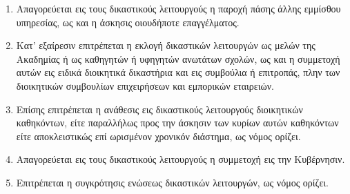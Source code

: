 \documentclass[twoside, a4paper, 10pt]{article}
\begin{document}
\begin{multicols}{2}
\begin{enumerate}
\begin{BigQuote}
\begin{enumerate}
  \item[1.] Απαγορεύεται εις τους δικαστικούς λειτουργούς η παροχή πάσης άλλης εμμίσθου υπηρεσίας, ως και η άσκησις οιουδήποτε  επαγγέλματος.
  \item[2.] Κατ' εξαίρεσιν επιτρέπεται η εκλογή δικαστικών λειτουργών ως μελών της Ακαδημίας ή ως καθηγητών ή υφηγητών ανωτάτων σχολών, ως και η συμμετοχή αυτών εις ειδικά διοικητικά δικαστήρια και εις συμβούλια ή επιτροπάς, πλην των διοικητικών συμβουλίων επιχειρήσεων και εμπορικών εταιρειών.
  \item[3.] Επίσης επιτρέπεται η ανάθεσις εις δικαστικούς λειτουργούς διοικητικών καθηκόντων, είτε παραλλήλως προς την άσκησιν των κυρίων αυτών καθηκόντων είτε αποκλειστικώς επί ωρισμένον
 χρονικόν διάστημα, ως νόμος ορίζει.
  \item[4.] Απαγορεύεται εις τους δικαστικούς λειτουργούς η συμμετοχή εις την Κυβέρνησιν.
  \item[5.] Επιτρέπεται η συγκρότησις ενώσεως δικαστικών λειτουργών, ως νόμος ορίζει.
\end{enumerate}


\end{BigQuote}
\end{enumerate}
\end{multicols}
\end{document}
